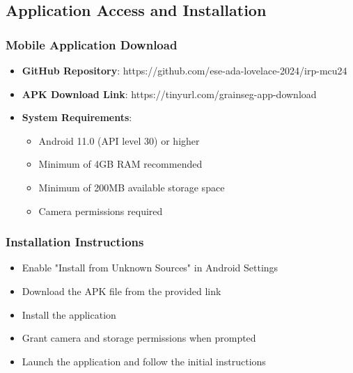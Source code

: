 \documentclass[final-report]{report-template}
\begin{document}
\subsection{Application Access and Installation}
\subsubsection{Mobile Application Download}

\begin{itemize}
    \item \textbf{GitHub Repository}: https://github.com/ese-ada-lovelace-2024/irp-mcu24
\end{itemize}
\begin{itemize}
    \item \textbf{APK Download Link}: https://tinyurl.com/grainseg-app-download
\end{itemize}
\begin{itemize}
    \item \textbf{System Requirements}:
    \begin{itemize}
        \item Android 11.0 (API level 30) or higher
        \item Minimum of 4GB RAM recommended
        \item Minimum of 200MB available storage space
        \item Camera permissions required
    \end{itemize}
\end{itemize}

\subsubsection{Installation Instructions}

\begin{itemize}
    \item Enable "Install from Unknown Sources" in Android Settings
    \item Download the APK file from the provided link
    \item Install the application
    \item Grant camera and storage permissions when prompted
    \item Launch the application and follow the initial instructions
\end{itemize}
\end{document}
